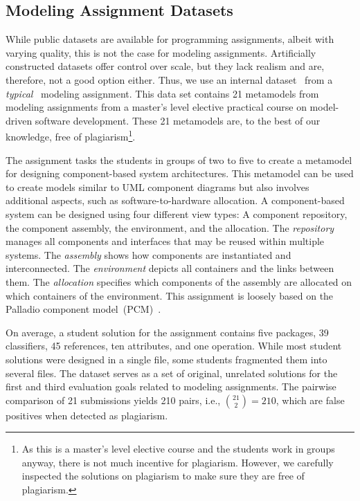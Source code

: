 \subsection{Modeling Assignment Datasets}\label{sec:datasets-mde}
While public datasets are available for programming assignments, albeit with varying quality, this is not the case for modeling assignments.
Artificially constructed datasets offer control over scale, but they lack realism and are, therefore, not a good option either.
Thus, we use an internal dataset~\cite{Saglam2022} from a \textit{typical}~\cite{Ciccozzi2018} modeling assignment.
This data set contains 21 metamodels from modeling assignments from a master's level elective practical course on model-driven software development.
These 21 metamodels are, to the best of our knowledge, free of plagiarism\footnote{As this is a master's level elective course and the students work in groups anyway, there is not much incentive for plagiarism. However, we carefully inspected the solutions on plagiarism to make sure they are free of plagiarism.}.

The assignment tasks the students in groups of two to five to create a metamodel for designing component-based system architectures. This metamodel can be used to create models similar to \ac{UML} component diagrams but also involves additional aspects, such as software-to-hardware allocation.
A component-based system can be designed using four different view types: A component repository, the component assembly, the environment, and the allocation.
The \textit{repository} manages all components and interfaces that may be reused within multiple systems. The \textit{assembly} shows how components are instantiated and interconnected. The \textit{environment} depicts all containers and the links between them. The \textit{allocation} specifies which components of the assembly are allocated on which containers of the environment.
This assignment is loosely based on the Palladio component model~(PCM)~\cite{reussner2016a, becker2008a}.

On average, a student solution for the assignment contains five packages, 39 classifiers, 45 references, ten attributes, and one operation.
While most student solutions were designed in a single file, some students fragmented them into several files.
%
The dataset serves as a set of original, unrelated solutions for the first and third evaluation goals related to modeling assignments. 
The pairwise comparison of 21 submissions yields 210 pairs, i.e., $\binom{21}{2}=210$, which are false positives when detected as plagiarism.




